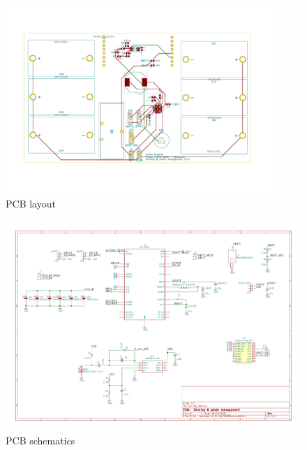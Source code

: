 \documentclass{EPL-master-thesis-covers-EN}
\begin{document}
\begin{figure}[H]
    \centering
    \includegraphics[width=0.9\textwidth]{sensing_PMU_layout.pdf}
    \caption{PCB layout}
    \label{fig:PCB_lay}
\end{figure}

\begin{figure}[H]
    \centering
    \includegraphics[width=\textwidth]{sensing_PMU_schematic.pdf}
    \caption{PCB schematics}
    \label{fig:PCB_sch}
\end{figure}





\backcoverpage
\end{document}
